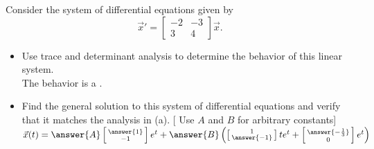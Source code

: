 \documentclass{ximera}
\begin{document}
\begin{exercise}
    Consider the system of differential equations given by 
    \begin{equation*}
        {\vec{x}}'  = \begin{bmatrix} -2 & -3 \\ 3 & 4 \end{bmatrix} \vec{x}.
    \end{equation*}
    \begin{itemize}
        \item Use trace and determinant analysis to determine the behavior of this linear system.\\
        The behavior is a  .
        \item Find the general solution to this system of differential equations and verify that it matches the analysis in (a). [ Use $A$ and $B$ for arbitrary constants]\\
        $\vec{x}(t) = \answer{A} \left[\begin{smallmatrix} \answer{1} \\ -1 \end{smallmatrix}\right]e^t + \answer{B}\left(\left[\begin{smallmatrix} 1 \\ \answer{-1} \end{smallmatrix}\right]te^t + \left[\begin{smallmatrix} \answer{-\frac{1}{3}} \\ 0 \end{smallmatrix}\right]e^t \right)$
    \end{itemize}
\end{exercise}
\end{document}
